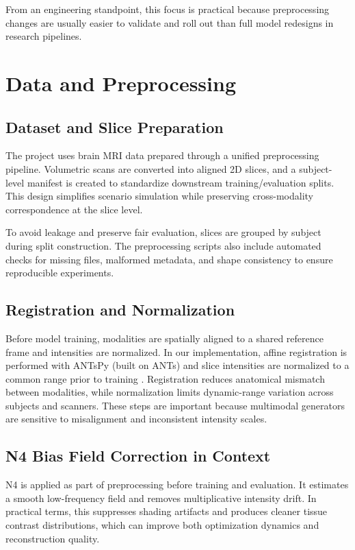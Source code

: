 \documentclass[conference]{IEEEtran}
\begin{document}
From an engineering standpoint, this focus is practical because preprocessing changes are usually easier to validate and roll out than full model redesigns in research pipelines.

\section{Data and Preprocessing}
\subsection{Dataset and Slice Preparation}
The project uses brain MRI data prepared through a unified preprocessing pipeline. Volumetric scans are converted into aligned 2D slices, and a subject-level manifest is created to standardize downstream training/evaluation splits. This design simplifies scenario simulation while preserving cross-modality correspondence at the slice level.

To avoid leakage and preserve fair evaluation, slices are grouped by subject during split construction. The preprocessing scripts also include automated checks for missing files, malformed metadata, and shape consistency to ensure reproducible experiments.

\subsection{Registration and Normalization}
Before model training, modalities are spatially aligned to a shared reference frame and intensities are normalized. In our implementation, affine registration is performed with ANTsPy (built on ANTs) and slice intensities are normalized to a common range prior to training \cite{avants2011ants}. Registration reduces anatomical mismatch between modalities, while normalization limits dynamic-range variation across subjects and scanners. These steps are important because multimodal generators are sensitive to misalignment and inconsistent intensity scales.

\subsection{N4 Bias Field Correction in Context}
N4 is applied as part of preprocessing before training and evaluation. It estimates a smooth low-frequency field and removes multiplicative intensity drift. In practical terms, this suppresses shading artifacts and produces cleaner tissue contrast distributions, which can improve both optimization dynamics and reconstruction quality.
\end{document}
